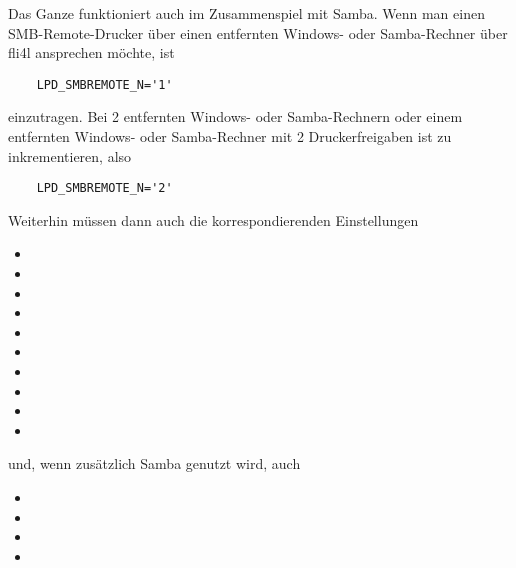 \begin{description}
    Das Ganze funktioniert auch im Zusammenspiel mit Samba. Wenn man einen
    SMB-Remote-Drucker über einen entfernten Windows- oder Samba-Rechner über
    fli4l ansprechen möchte, ist

\begin{example}
\begin{verbatim}
    LPD_SMBREMOTE_N='1'
\end{verbatim}
\end{example}

    einzutragen. Bei 2 entfernten Windows- oder Samba-Rechnern oder einem
    entfernten Windows- oder Samba-Rechner mit 2 Druckerfreigaben ist 
    zu inkrementieren, also

\begin{example}
\begin{verbatim}
    LPD_SMBREMOTE_N='2'
\end{verbatim}
\end{example}

    Weiterhin müssen dann auch die korrespondierenden Einstellungen

\begin{itemize}
\item {}
\item {}
\item {}
\item {}
\item {}
\item {}
\item {}
\item {}
\item {}
\item {}
\end{itemize}

    und, wenn zusätzlich Samba genutzt wird, auch

\begin{itemize}
\item {}
\item {}
\item {}
\item {}
\end{itemize}


\end{description}
